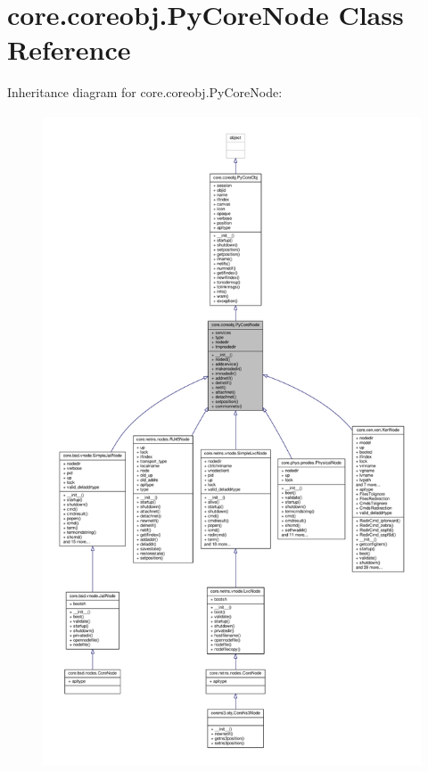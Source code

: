 \hypertarget{classcore_1_1coreobj_1_1_py_core_node}{\section{core.\+coreobj.\+Py\+Core\+Node Class Reference}
\label{classcore_1_1coreobj_1_1_py_core_node}
}


Inheritance diagram for core.\+coreobj.\+Py\+Core\+Node\+:
\nopagebreak
\begin{figure}[H]
\begin{center}
\leavevmode
\includegraphics[height=550pt]{classcore_1_1coreobj_1_1_py_core_node__inherit__graph}
\end{center}
\end{figure}


